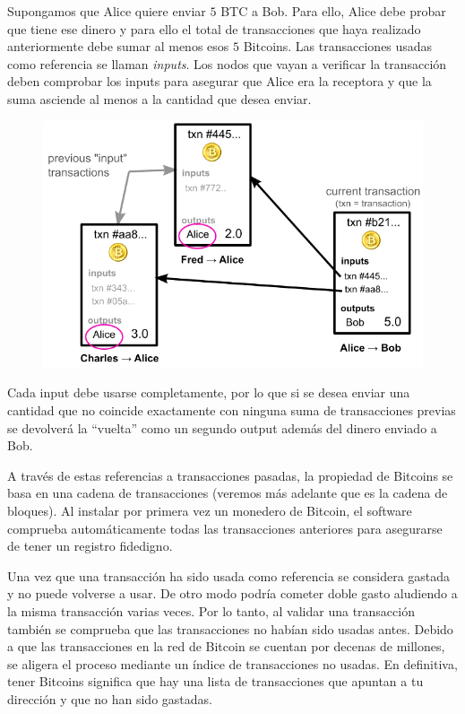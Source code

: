 \documentclass[twoside]{article}
\theoremstyle{definition}
\begin{document}
Supongamos que Alice quiere enviar $5$ BTC a Bob. Para ello, Alice debe probar que tiene ese dinero y para ello el total de transacciones que haya realizado anteriormente debe sumar al menos esos $5$ Bitcoins. Las transacciones usadas como referencia se llaman \emph{inputs}. Los nodos que vayan a verificar la transacción deben comprobar los inputs para asegurar que Alice era la receptora y que la suma asciende al menos a la cantidad que desea enviar.
\begin{figure}[h!]
\includegraphics[scale=0.4]{inputs}
\end{figure}

Cada input debe usarse completamente, por lo que si se desea enviar una cantidad que no coincide exactamente con ninguna suma de transacciones previas se devolverá la ``vuelta'' como un segundo output además del dinero enviado a Bob. 

A través de estas referencias a transacciones pasadas, la propiedad de Bitcoins se basa en una cadena de transacciones (veremos más adelante que es la cadena de bloques). Al instalar por primera vez un monedero de Bitcoin, el software comprueba automáticamente todas las transacciones anteriores para asegurarse de tener un registro fidedigno.

Una vez que una transacción ha sido usada como referencia se considera gastada y no puede volverse a usar. De otro modo podría cometer doble gasto aludiendo a la misma transacción varias veces. Por lo tanto, al validar una transacción también se comprueba que las transacciones no habían sido usadas antes. Debido a que las transacciones en la red de Bitcoin se cuentan por decenas de millones, se aligera el proceso mediante un índice de transacciones no usadas. En definitiva, tener Bitcoins significa que hay una lista de transacciones que apuntan a tu dirección y que no han sido gastadas.
\end{document}
